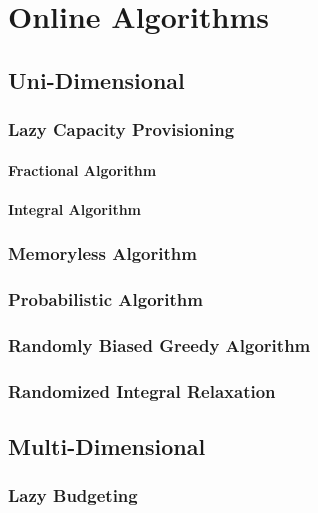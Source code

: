 
\chapter{Online Algorithms}\label{chapter:algorithms}

\section{Uni-Dimensional}

\subsection{Lazy Capacity Provisioning}

\subsubsection{Fractional Algorithm}

\subsubsection{Integral Algorithm}

\subsection{Memoryless Algorithm}

\subsection{Probabilistic Algorithm}

\subsection{Randomly Biased Greedy Algorithm}

\subsection{Randomized Integral Relaxation}

\section{Multi-Dimensional}

\subsection{Lazy Budgeting}

